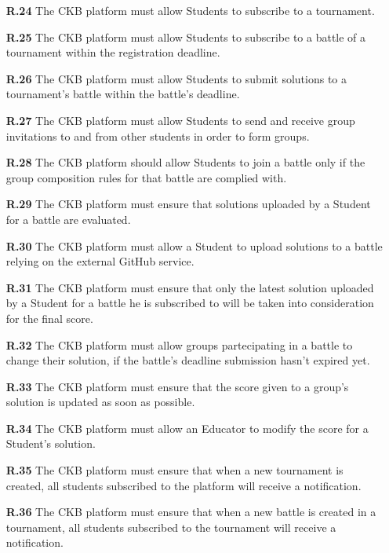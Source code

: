 \documentclass{article}
\begin{document}
{\begin{itemize}
            \item[\textbf{R.24}] The CKB platform must allow Students to subscribe to a tournament.
            \item[\textbf{R.25}] The CKB platform must allow Students to subscribe to a battle of a tournament
            within the registration deadline.
            \item[\textbf{R.26}] The CKB platform must allow Students to submit solutions to a tournament's battle 
            within the battle's deadline.
            \item[\textbf{R.27}] The CKB platform must allow Students to send and receive group invitations to and from
            other students in order to form groups.
            \item[\textbf{R.28}] The CKB platform should allow Students to join a battle only if the group composition rules 
            for that battle are complied with.
            \item[\textbf{R.29}] The CKB platform must ensure that solutions uploaded by a Student for a battle are evaluated.
            \item[\textbf{R.30}] The CKB platform must allow a Student to upload solutions to a battle relying on the
            external GitHub service.
            \item[\textbf{R.31}] The CKB platform must ensure that only the latest solution uploaded by a Student for a battle he is subscribed to will
            be taken into consideration for the final score.
            \item[\textbf{R.32}] The CKB platform must allow groups partecipating in a battle to change their solution, 
            if the battle's deadline submission hasn't expired yet.
            \item[\textbf{R.33}] The CKB platform must ensure that the score given to a group's solution is
            updated as soon as possible.
            \item[\textbf{R.34}] The CKB platform must allow an Educator to modify the score for a Student's solution.
            \item[\textbf{R.35}] The CKB platform must ensure that when a new tournament is created, all
            students subscribed to the platform will receive a notification.
            \item[\textbf{R.36}] The CKB platform must ensure that when a new battle is created in a tournament, 
            all students subscribed to the tournament will receive a notification.

\end{itemize}}
\end{document}
